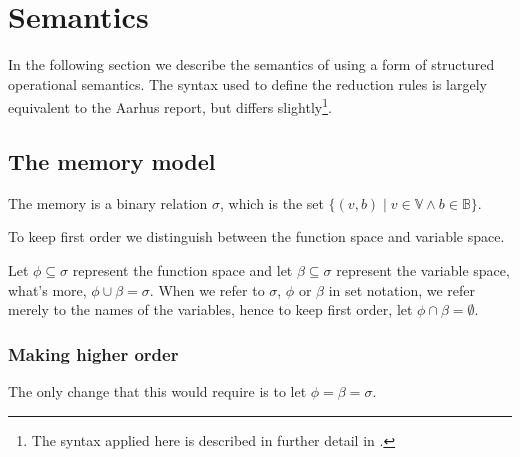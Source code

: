 \section{Semantics}\label{section:d-sos}





In the following section we describe the semantics of \D{} using a form of
structured operational semantics. The syntax used to define the reduction rules
is largely equivalent to the Aarhus report\cite{sos}, but differs
slightly\footnote{The syntax applied here is described in further detail in
.}.

\subsection{The memory model}\label{section:d-semantics-memory}

\begin{definition}\label{definition:memory} The memory is a binary relation
$\sigma$, which is the set $\{(v,b)\mid v\in\mathbb{V} \wedge
b\in\mathbb{B}\}$.\end{definition}

To keep \D{} first order we distinguish between the function space and variable
space.

\begin{definition} Let $\phi\subseteq\sigma$ represent the function space and
let $\beta\subseteq\sigma$ represent the variable space, what's more,
$\phi\cup\beta=\sigma$. When we refer to $\sigma$, $\phi$ or $\beta$ in set
notation, we refer merely to the names of the variables, hence to keep \D{}
first order, let $\phi\cap\beta=\emptyset$.\end{definition}

\subsubsection{Making \D{} higher order}

The only change that this would require is to let $\phi=\beta=\sigma$.

